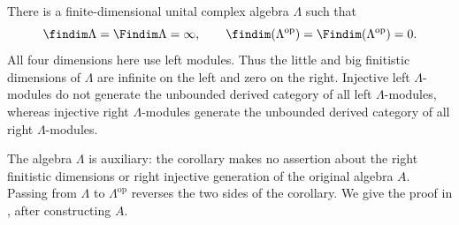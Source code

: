 \begin{corollary}
\label{cor:left-right-asymmetry}
There is a finite-dimensional unital complex algebra \(\Lambda\) such that
\[
\findim \Lambda=\Findim \Lambda=\infty,
\qquad
\findim(\Lambda^{\mathrm{op}})=\Findim(\Lambda^{\mathrm{op}})=0.
\]
All four dimensions here use left modules. Thus the little and big
finitistic dimensions of \(\Lambda\) are infinite on the left and zero
on the right. Injective left \(\Lambda\)-modules do not generate the
unbounded derived category of all left \(\Lambda\)-modules, whereas
injective right \(\Lambda\)-modules generate the unbounded derived
category of all right \(\Lambda\)-modules.
\end{corollary}

The algebra \(\Lambda\) is auxiliary: the corollary makes no assertion
about the right finitistic dimensions or right injective generation of
the original algebra \(A\). Passing from \(\Lambda\) to
\(\Lambda^{\mathrm{op}}\) reverses the two sides of the corollary.
We give the proof in , after constructing
\(A\).
